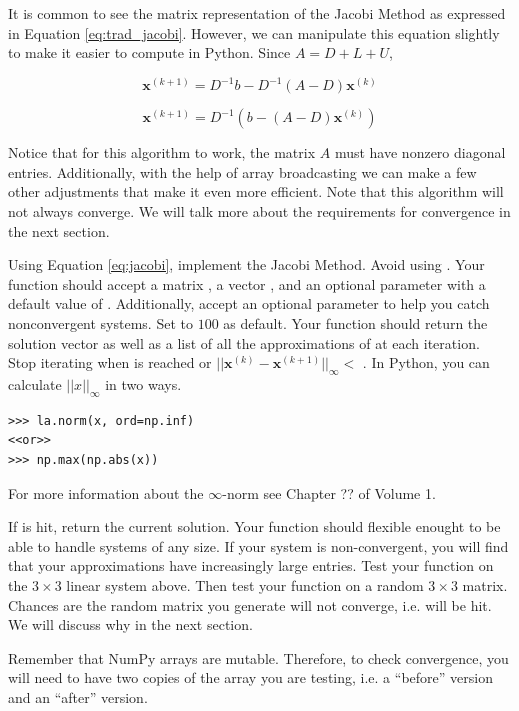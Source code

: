 It is common to see the matrix representation of the Jacobi Method as expressed in
Equation \ref{eq:trad_jacobi}.
However, we can manipulate this equation slightly to make it easier to compute
in Python. Since $A = D + L + U$,

$$\mathbf{x}^{(k+1)} = D^{-1}b - D^{-1}(A-D)\mathbf{x}^{(k)} $$

\begin{equation} \label{eq:jacobi}
    \mathbf{x}^{(k+1)} = D^{-1}(b - (A-D)\mathbf{x}^{(k)})
\end{equation}

Notice that for this algorithm to
work, the matrix $A$ must have nonzero diagonal entries. Additionally, with the
help of array broadcasting we can make a few other adjustments that make it even
more efficient. Note that this algorithm will not always converge. We will talk
more about the requirements for convergence in the next section.

\begin{problem} %
Using Equation \ref{eq:jacobi}, implement the Jacobi Method. Avoid using
. Your function should accept a matrix , a vector , and
an optional parameter  with a default value of . Additionally,
accept an optional parameter  to help you catch nonconvergent
systems. Set  to $100$ as default. Your function should return the
solution vector  as well as a list of all the approximations of 
at each iteration. Stop iterating when  is reached or
$||\mathbf{x}^{(k)} - \mathbf{x}^{(k+1)}||_{\infty} < $ . In Python, you
can calculate $||x||_{\infty}$ in two ways.
\begin{lstlisting}
>>> la.norm(x, ord=np.inf)
<<or>>
>>> np.max(np.abs(x))
\end{lstlisting}
For more information about the $\infty$-norm see Chapter ?? of Volume 1.

If  is hit, return the current solution. Your function should flexible enought
to be able to handle systems of any size. If your
system is non-convergent, you will find that your approximations have increasingly
large entries. Test your function on the $3 \times 3$ linear system above. Then
test your function on a random $3 \times 3$ matrix. Chances are the random matrix
you generate will not converge, i.e.  will be hit.
We will discuss why in the next section.

\begin{info}
Remember that NumPy arrays are mutable. Therefore, to check convergence, you
will need to have two copies of the array you are testing,
i.e. a ``before'' version and an ``after'' version.
\end{info}
\label{prob:jacobi}
\end{problem}

